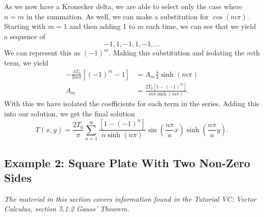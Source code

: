 \documentclass[11pt]{report}
\newcommand{\fpar}[1]{\left({#1}\right)}
\newcommand{\fbrac}[1]{\left[{#1}\right]}
\begin{document}
As we now have a Kronecker delta, we are able to select only the case where $n=m$ in the summation. As well, we can make a substitution for $\cos\fpar{m\pi}$. Starting with $m=1$ and then adding 1 to $m$ each time, we can see that we yield a sequence of
    \[-1,1,-1,1,-1,...\]
We can represent this as $\fpar{-1}^m$. Making this substitution and isolating the $m$th term, we yield
    \begin{align*}
        -\frac{\lambda T_0}{2m\pi}\fbrac{(-1)^m-1} &=  A_m\frac{\lambda}{4}\sinh\fpar{m\pi}\\
        A_m &= \frac{2T_0\fbrac{1-\fpar{-1}^m}}{m\pi\sinh\fpar{m\pi}}.
    \end{align*}
With this we have isolated the coefficients for each term in the series. Adding this into our solution, we get the final solution
    \[T(x,y) = \frac{2T_0}{\pi}\sum_{n=1}^\infty \frac{\fbrac{1-(-1)^n}}{n\sinh\fpar{n\pi}}\sin\fpar{\frac{n\pi}{a}x}\sinh\fpar{\frac{n\pi}{a}y}.\]
    
    
    
\subsection{Example 2: Square Plate With Two Non-Zero Sides}

\emph{The material in this section covers information found in the Tutorial VC: Vector Calculus, section 5.1.2 Gauss’ Theorem.}\\
\end{document}

